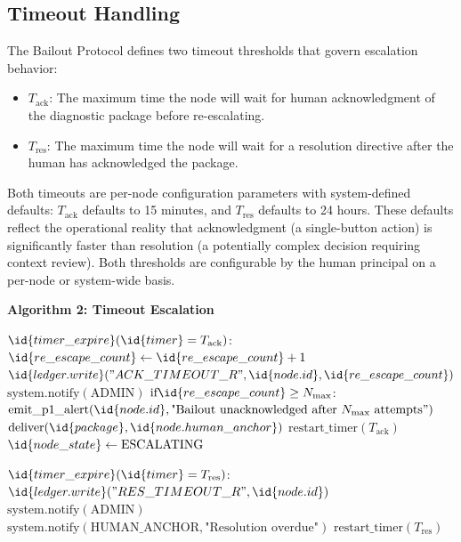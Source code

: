\begin{definition}[Protocol Override Invariant]
\subsection{Timeout Handling}
\label{sec:timeouts}

The Bailout Protocol defines two timeout thresholds that govern escalation behavior:

\begin{itemize}
\item $T_{\text{ack}}$: The maximum time the node will wait for human acknowledgment of the diagnostic package before re-escalating.
\item $T_{\text{res}}$: The maximum time the node will wait for a resolution directive after the human has acknowledged the package.
\end{itemize}

Both timeouts are per-node configuration parameters with system-defined defaults: $T_{\text{ack}}$ defaults to 15 minutes, and $T_{\text{res}}$ defaults to 24 hours. These defaults reflect the operational reality that acknowledgment (a single-button action) is significantly faster than resolution (a potentially complex decision requiring context review). Both thresholds are configurable by the human principal on a per-node or system-wide basis.

\bigskip
\noindent\textbf{Algorithm 2: Timeout Escalation}

\begin{algorithmic}
\State {} $\id{timer\_expire}(\id{timer} = T_{\text{ack}})$:
\State \quad $\id{re\_escape\_count} \gets \id{re\_escape\_count} + 1$
\State \quad $\id{ledger.write}("ACK\_TIMEOUT\_R", \id{node.id}, \id{re\_escape\_count})$
\State \quad $\text{system.notify}(\text{ADMIN})$ 
\State \quad $\text{if} \id{re\_escape\_count} \geq N_{\text{max}}$:
\State \quad \quad $\text{emit\_p1\_alert}(\id{node.id}, \text{"Bailout unacknowledged after } N_{\text{max}} \text{ attempts}")$
\State \quad $\text{deliver}(\id{package}, \id{node.human\_anchor})$ 
\State \quad $\text{restart\_timer}(T_{\text{ack}})$
\State \quad $\id{node\_state} \gets \text{ESCALATING}$

\State {} $\id{timer\_expire}(\id{timer} = T_{\text{res}})$:
\State \quad $\id{ledger.write}("RES\_TIMEOUT\_R", \id{node.id})$
\State \quad $\text{system.notify}(\text{ADMIN})$
\State \quad $\text{system.notify}(\text{HUMAN\_ANCHOR}, \text{"Resolution overdue"})$
\State \quad $\text{restart\_timer}(T_{\text{res}})$ 
\end{algorithmic}


\end{definition}
